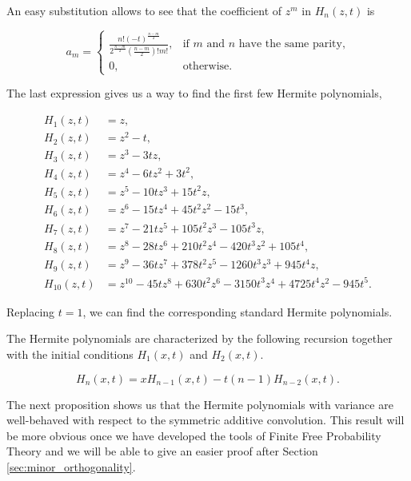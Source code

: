 An easy substitution allows to see that the coefficient of $z^m$ in $H_n(z,t)$ is 

\begin{equation}
    a_m = \left\{ \begin{array}{cc}
        \frac{n!(-t)^{\frac{n-m}2}}{2^{\frac{n-m}{2}}\left( \frac{n-m}{2}\right)!m!}, &  \text{if $m$ and $n$ have the same parity,} \\
        0, & \text{otherwise}.
    \end{array} \right.
\end{equation}


The last expression gives us a way to find the first few Hermite polynomials,

\begin{align*}
    H_1(z,t) &= z,\\
    H_2(z,t) &= z^2 - t, \\
    H_3(z,t) &= z^3 - 3tz,\\ 
    H_4(z,t) &= z^4 - 6tz^2 + 3t^2,\\ 
    H_5(z,t) &= z^5 - 10tz^3 + 15t^2z,\\ 
    H_6(z,t) &= z^6 - 15tz^4 + 45 t^2 z^2 - 15t^3,\\ 
    H_7(z,t) &= z^7 - 21tz^5 + 105t^2z^3 -105t^3z,\\ 
    H_8(z,t) &= z^8 - 28tz^6 + 210t^2z^4 - 420t^3z^2 + 105t^4,\\ 
    H_9(z,t) &= z^9 - 36tz^7 + 378t^2z^5 - 1260t^3z^3 + 945t^4z,\\ 
    H_{10}(z,t) &= z^{10} - 45tz^8 + 630t^2z^6 - 3150t^3z^4 + 4725t^4z^2 - 945t^5.
\end{align*}

Replacing $t=1$, we can find the corresponding standard Hermite polynomials.

The Hermite polynomials are characterized by the following recursion together with the initial conditions $H_1(x,t)$ and $H_2(x,t)$.

\begin{equation} \label{eq:recursion_hermite}
    H_n(x,t) = x H_{n-1}(x,t) - t(n-1)H_{n-2}(x,t).
\end{equation}


The next proposition shows us that the Hermite polynomials with variance are well-behaved with respect to the symmetric additive convolution. This result will be more obvious once we have developed the tools of Finite Free Probability Theory and we will be able to give an easier proof after Section \ref{sec:minor_orthogonality}.

